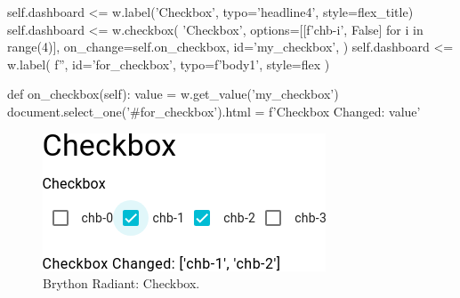 \begin{python}
    self.dashboard <= w.label('Checkbox', typo='headline4', style=flex_title)
    self.dashboard <= w.checkbox(
        'Checkbox',
        options=[[f'chb-{i}', False] for i in range(4)],
        on_change=self.on_checkbox,
        id='my_checkbox',
    )
    self.dashboard <= w.label(
        f'', id='for_checkbox', typo=f'body1', style=flex
    )


def on_checkbox(self):
    value = w.get_value('my_checkbox')
    document.select_one('#for_checkbox').html = f'Checkbox Changed: {value}'
\end{python}


\begin{figure}[H]
\begin{centering}
\includegraphics[scale=0.5]{Cap4/Figures/widgets/checkbox.png}
\par\end{centering}
\caption[Brython Radiant: Checkbox]{Brython Radiant: Checkbox.}
\label{fig:radiant_checkbox}
\end{figure}